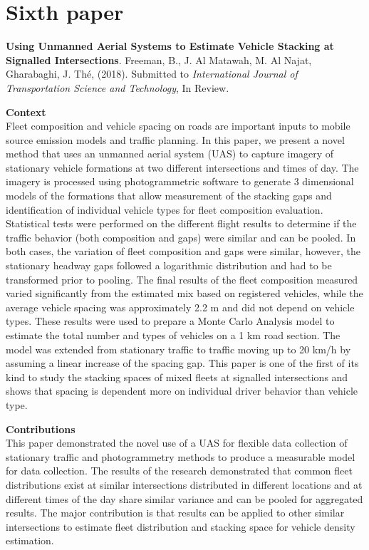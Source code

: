 \section{Sixth paper}
\noindent
\textbf{Using Unmanned Aerial Systems to Estimate Vehicle Stacking at Signalled Intersections}.  Freeman,  B., J. Al Matawah, M. Al Najat, Gharabaghi, J.  Th\'e, (2018). Submitted to \textit{International Journal of Transportation Science and Technology}, In Review.

\vspace{5mm}
\noindent
\textbf{Context}\\
\noindent
Fleet composition and vehicle spacing on roads are important inputs to mobile source emission models and traffic planning. In this paper, we present a novel method that uses an unmanned aerial system (UAS) to capture imagery of stationary vehicle formations at two different intersections and times of day. The imagery is processed using photogrammetric software to generate 3 dimensional models of the formations that allow measurement of the stacking gaps and identification of individual vehicle types for fleet composition evaluation. Statistical tests were performed on the different flight results to determine if the traffic behavior (both composition and gaps) were similar and can be pooled. In both cases, the variation of fleet composition and gaps were similar, however, the stationary headway gaps followed a logarithmic distribution and had to be transformed prior to pooling. The final results of the fleet composition measured varied significantly from the estimated mix based on registered vehicles, while the average vehicle spacing was approximately 2.2 m and did not depend on vehicle types. These results were used to prepare a Monte Carlo Analysis model to estimate the total number and types of vehicles on a 1 km road section. The model was extended from stationary traffic to traffic moving up to 20 km/h by assuming a linear increase of the spacing gap. This paper is one of the first of its kind to study the stacking spaces of mixed fleets at signalled intersections and shows that spacing is dependent more on individual driver behavior than vehicle type.

\vspace{5mm}
\noindent
\textbf{Contributions}\\
\noindent
This paper demonstrated the novel use of a UAS for flexible data collection of stationary traffic and photogrammetry methods to produce a measurable model for data collection. The results of the research demonstrated that common fleet distributions exist at similar intersections distributed in different locations and at different times of the day share similar variance and can be pooled for aggregated results. The major contribution is that results can be applied to other similar intersections to estimate fleet distribution and stacking space for vehicle density estimation.



\clearpage
